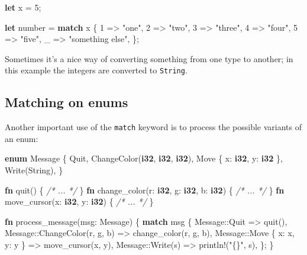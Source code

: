 \documentclass[a4paper,]{book}
\newenvironment{Shaded}{\begin{snugshade}}{\end{snugshade}}
\newcommand{\KeywordTok}[1]{\textcolor[rgb]{0.13,0.29,0.53}{\textbf{{#1}}}}
\newcommand{\DecValTok}[1]{\textcolor[rgb]{0.00,0.00,0.81}{{#1}}}
\newcommand{\StringTok}[1]{\textcolor[rgb]{0.31,0.60,0.02}{{#1}}}
\newcommand{\CommentTok}[1]{\textcolor[rgb]{0.56,0.35,0.01}{\textit{{#1}}}}
\newcommand{\OtherTok}[1]{\textcolor[rgb]{0.56,0.35,0.01}{{#1}}}
\newcommand{\NormalTok}[1]{{#1}}
\begin{document}
\begin{Shaded}
\begin{Highlighting}[]
\KeywordTok{let} \NormalTok{x = }\DecValTok{5}\NormalTok{;}

\KeywordTok{let} \NormalTok{number = }\KeywordTok{match} \NormalTok{x \{}
    \DecValTok{1} \NormalTok{=> }\StringTok{"one"}\NormalTok{,}
    \DecValTok{2} \NormalTok{=> }\StringTok{"two"}\NormalTok{,}
    \DecValTok{3} \NormalTok{=> }\StringTok{"three"}\NormalTok{,}
    \DecValTok{4} \NormalTok{=> }\StringTok{"four"}\NormalTok{,}
    \DecValTok{5} \NormalTok{=> }\StringTok{"five"}\NormalTok{,}
    \NormalTok{_ => }\StringTok{"something else"}\NormalTok{,}
\NormalTok{\};}
\end{Highlighting}
\end{Shaded}

Sometimes it's a nice way of converting something from one type to
another; in this example the integers are converted to \texttt{String}.

\subsection{Matching on enums}\label{matching-on-enums}

Another important use of the \texttt{match} keyword is to process the
possible variants of an enum:

\begin{Shaded}
\begin{Highlighting}[]
\KeywordTok{enum} \NormalTok{Message \{}
    \NormalTok{Quit,}
    \NormalTok{ChangeColor(}\KeywordTok{i32}\NormalTok{, }\KeywordTok{i32}\NormalTok{, }\KeywordTok{i32}\NormalTok{),}
    \NormalTok{Move \{ x: }\KeywordTok{i32}\NormalTok{, y: }\KeywordTok{i32} \NormalTok{\},}
    \NormalTok{Write(String),}
\NormalTok{\}}

\KeywordTok{fn} \NormalTok{quit() \{ }\CommentTok{/* ... */} \NormalTok{\}}
\KeywordTok{fn} \NormalTok{change_color(r: }\KeywordTok{i32}\NormalTok{, g: }\KeywordTok{i32}\NormalTok{, b: }\KeywordTok{i32}\NormalTok{) \{ }\CommentTok{/* ... */} \NormalTok{\}}
\KeywordTok{fn} \NormalTok{move_cursor(x: }\KeywordTok{i32}\NormalTok{, y: }\KeywordTok{i32}\NormalTok{) \{ }\CommentTok{/* ... */} \NormalTok{\}}

\KeywordTok{fn} \NormalTok{process_message(msg: Message) \{}
    \KeywordTok{match} \NormalTok{msg \{}
        \NormalTok{Message::Quit => quit(),}
        \NormalTok{Message::ChangeColor(r, g, b) => change_color(r, g, b),}
        \NormalTok{Message::Move \{ x: x, y: y \} => move_cursor(x, y),}
        \NormalTok{Message::Write(s) => }\OtherTok{println!}\NormalTok{(}\StringTok{"\{\}"}\NormalTok{, s),}
    \NormalTok{\};}
\NormalTok{\}}
\end{Highlighting}
\end{Shaded}
\end{document}
